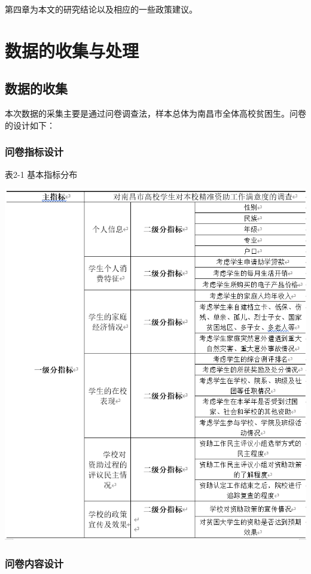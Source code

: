 \documentclass[UTF8,a4paper,12pt]{ctexart}  %
\begin{document}
第四章为本文的研究结论以及相应的一些政策建议。

\hypertarget{section-12}{%
\section{数据的收集与处理}\label{section-12}}

\hypertarget{section-13}{%
\subsection{数据的收集}\label{section-13}}

本次数据的采集主要是通过问卷调查法，样本总体为南昌市全体高校贫困生。问卷的设计如下：

\hypertarget{section-14}{%
\subsubsection{问卷指标设计}\label{section-14}}

表2-1 基本指标分布

\includegraphics{idx1.png}

\hypertarget{section-15}{%
\subsubsection{问卷内容设计}\label{section-15}}
\end{document}
